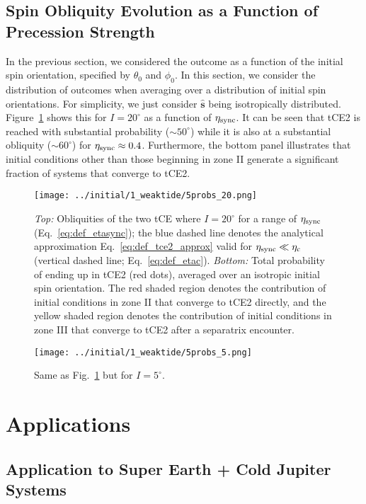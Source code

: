 \documentclass[
        fleqn,
        usenatbib,
    ]{mnras}
\newcommand*{\uv}[1]{\hat{\mathbf{#1}}}
\begin{document}
\subsection{Spin Obliquity Evolution as a Function of Precession Strength}

In the previous section, we considered the outcome as a function of the initial
spin orientation, specified by $\theta_0$ and $\phi_0$. In this section, we
consider the distribution of outcomes when averaging over a distribution of
initial spin orientations. For simplicity, we just consider $\uv{s}$ being
isotropically distributed. Figure~\ref{fig:probs20} shows this for $I
= 20^\circ$ as a function of $\eta_{\rm sync}$. It can be seen that tCE2 is
reached with substantial probability ($\sim 50^\circ$) while it is also at a
substantial obliquity ($\sim 60^\circ$) for $\eta_{\rm sync} \approx 0.4$.
Furthermore, the bottom panel illustrates that initial conditions other than
those beginning in zone II generate a significant fraction of systems that
converge to tCE2.
\begin{figure}
    \centering
    \texttt{[image: ../initial/1\_weaktide/5probs\_20.png]}
    \caption{\emph{Top:} Obliquities of the two tCE where $I = 20^\circ$ for a
    range of $\eta_{\rm sync}$ (Eq.~\ref{eq:def_etasync}); the blue dashed line
    denotes the analytical approximation Eq.~\eqref{eq:def_tce2_approx} valid
    for $\eta_{\rm sync} \ll \eta_{\rm c}$ (vertical dashed line;
    Eq.~\ref{eq:def_etac}). \emph{Bottom:} Total probability of ending up in
    tCE2 (red dots), averaged over an isotropic initial spin orientation. The
    red shaded region denotes the contribution of initial conditions in zone II
    that converge to tCE2 directly, and the yellow shaded region denotes the
    contribution of initial conditions in zone III that converge to tCE2 after a
    separatrix encounter. }\label{fig:probs20}
\end{figure}
\begin{figure}
    \centering
    \texttt{[image: ../initial/1\_weaktide/5probs\_5.png]}
    \caption{Same as Fig.~\ref{fig:probs20} but for $I =
    5^\circ$.}\label{fig:probs5}
\end{figure}

\section{Applications}

\subsection{Application to Super Earth + Cold Jupiter Systems
}\label{ss:disc_sehj}
\end{document}
